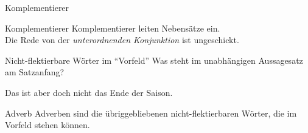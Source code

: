 \begin{frame}
  {Komplementierer}
  \pause
  \begin{exe}
    \ex
    \begin{xlist}
    \end{xlist}
  \end{exe}
  \Zeile
  \pause
  \pause
  \pause
  \pause
  \pause
  \pause
  \pause
  \pause
  \pause
  \pause
  \begin{block}{Komplementierer}
    Komplementierer leiten Nebensätze ein.\\
    Die Rede von der \textit{unterordnenden Konjunktion} ist ungeschickt.
  \end{block}
\end{frame}

\begin{frame}
  {Nicht-flektierbare Wörter im "`Vorfeld"'}
  \pause
  Was steht im unabhängigen Aussagesatz am Satzanfang?\\
  \pause
  {}
  \pause
  \begin{exe}
    \ex\label{ex:adverbenadkopulasundpartikeln038}
    \begin{xlist}
      \pause
      \pause
      \pause
      \pause
      \pause
      \pause
      \pause
      \pause
      \pause
      \pause
    \end{xlist}
    \ex\label{ex:adverbenadkopulasundpartikeln044} Das ist aber \alert{doch} nicht das Ende der Saison.
  \end{exe}
  \pause
  \Viertelzeile
  \begin{block}{Adverb}
    Adverben sind die übriggebliebenen nicht-flektierbaren Wörter, die im Vorfeld stehen können.
  \end{block}
\end{frame}


